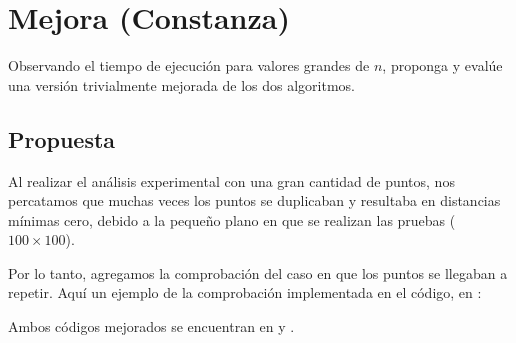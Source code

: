 \documentclass[main.tex]{subfiles}
\begin{document}
\section{Mejora (Constanza)}

Observando el tiempo de ejecución para valores grandes de $n$, proponga y evalúe una versión
trivialmente mejorada de los dos algoritmos.


\subsection{Propuesta}
Al realizar el análisis experimental con una gran cantidad de puntos, nos percatamos que muchas
veces los puntos se duplicaban y resultaba en distancias mínimas cero, debido a la pequeño plano en
que se realizan las pruebas ($100 \times 100$).

Por lo tanto, agregamos la comprobación del caso en que los puntos se llegaban a repetir.
Aquí un ejemplo de la comprobación implementada en el código, en :
\vspace{1em}

\vspace{1em}
Ambos códigos mejorados se encuentran en  y
.
\end{document}
